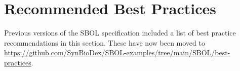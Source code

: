 \section{Recommended Best Practices}
\label{sec:bestpractices}

Previous versions of the SBOL specification included a list of best practice recommendations in this section.
These have now been moved to \href{https://github.com/SynBioDex/SBOL-examples/tree/main/SBOL/best-practices}{https://github.com/SynBioDex/SBOL-examples/tree/main/SBOL/best-practices}.
